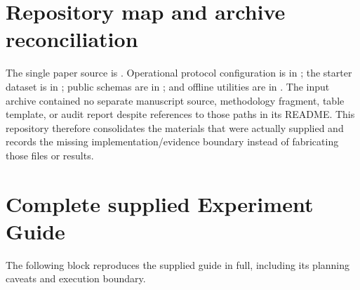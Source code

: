 \documentclass[11pt,a4paper]{article}
\begin{document}
\section{Repository map and archive reconciliation}

The single paper source is . Operational protocol configuration is in ; the starter dataset is in ; public schemas are in ; and offline utilities are in . The input archive contained no separate manuscript source, methodology fragment, table template, or audit report despite references to those paths in its README. This repository therefore consolidates the materials that were actually supplied and records the missing implementation/evidence boundary instead of fabricating those files or results.

\appendix

\section{Complete supplied Experiment Guide}
\label{app:guide}

The following block reproduces the supplied guide in full, including its planning caveats and execution boundary.
\end{document}
